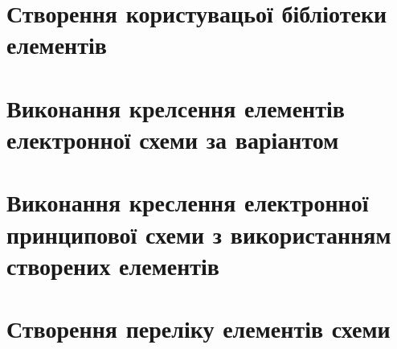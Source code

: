 \FloatBarrier
\section{Створення користувацьої бібліотеки елементів}

\section{Виконання крелсення елементів електронної схеми за варіантом}

\section{Виконання креслення електронної принципової схеми з використанням створених елементів}

\section{Створення переліку  елементів схеми}

